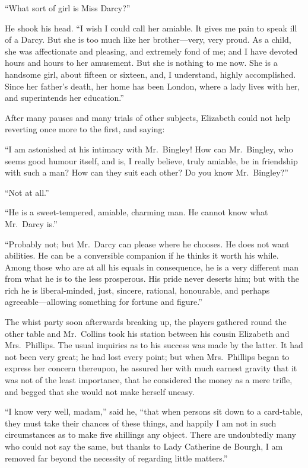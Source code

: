 \documentclass[12pt,english]{book}
\begin{document}
{}``What sort of girl is Miss Darcy?''\ 

He shook his head. {}``I wish I could call her amiable. It gives
me pain to speak ill of a Darcy. But she is too much like her brother\mbox{---}very,
very proud. As a child, she was affectionate and pleasing, and extremely
fond of me; and I have devoted hours and hours to her amusement. But
she is nothing to me now. She is a handsome girl, about fifteen or
sixteen, and, I understand, highly accomplished. Since her father's
death, her home has been London, where a lady lives with her, and
superintends her education.''

After many pauses and many trials of other subjects, Elizabeth could
not help reverting once more to the first, and saying:

{}``I am astonished at his intimacy with Mr.\ Bingley! How can Mr.\
Bingley, who seems good humour itself, and is, I really believe, truly
amiable, be in friendship with such a man? How can they suit each
other? Do you know Mr.\ Bingley?''\ 

{}``Not at all.''

{}``He is a sweet-tempered, amiable, charming man. He cannot know
what Mr.\ Darcy is.''

{}``Probably not; but Mr.\ Darcy can please where he chooses. He
does not want abilities. He can be a conversible companion if he thinks
it worth his while. Among those who are at all his equals in consequence,
he is a very different man from what he is to the less prosperous.
His pride never deserts him; but with the rich he is liberal-minded,
just, sincere, rational, honourable, and perhaps agreeable\mbox{---}allowing
something for fortune and figure.''

The whist party soon afterwards breaking up, the players gathered
round the other table and Mr.\ Collins took his station between his
cousin Elizabeth and Mrs.\ Phillips. The usual inquiries as to his
success was made by the latter. It had not been very great; he had
lost every point; but when Mrs.\ Phillips began to express her concern
thereupon, he assured her with much earnest gravity that it was not
of the least importance, that he considered the money as a mere trifle,
and begged that she would not make herself uneasy.

{}``I know very well, madam,'' said he, {}``that when persons sit
down to a card-table, they must take their chances of these things,
and happily I am not in such circumstances as to make five shillings
any object. There are undoubtedly many who could not say the same,
but thanks to Lady Catherine de Bourgh, I am removed far beyond the
necessity of regarding little matters.''
\end{document}
